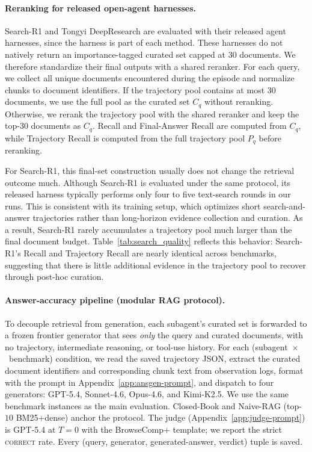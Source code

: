 \documentclass{article}
\begin{document}
\paragraph{Reranking for released open-agent harnesses.}
Search-R1 and Tongyi DeepResearch are evaluated with their released agent harnesses, since the harness is part of each method. These harnesses do not natively return an importance-tagged curated set capped at $30$ documents. We therefore standardize their final outputs with a shared reranker. For each query, we collect all unique documents encountered during the episode and normalize chunks to document identifiers. If the trajectory pool contains at most $30$ documents, we use the full pool as the curated set $C_q$ without reranking. Otherwise, we rerank the trajectory pool with the shared reranker and keep the top-$30$ documents as $C_q$. Recall and Final-Answer Recall are computed from $C_q$, while Trajectory Recall is computed from the full trajectory pool $P_q$ before reranking.

For Search-R1, this final-set construction usually does not change the
retrieval outcome much. Although Search-R1 is evaluated under the same protocol,
its released harness typically performs only four to five text-search rounds in
our runs. This is consistent with its training setup, which optimizes short
search-and-answer trajectories rather than long-horizon evidence collection and
curation. As a result, Search-R1 rarely accumulates a trajectory pool much
larger than the final document budget. Table~\ref{tab:search_quality} reflects
this behavior: Search-R1's Recall and Trajectory Recall are nearly identical
across benchmarks, suggesting that there is little additional evidence in the
trajectory pool to recover through post-hoc curation.

\paragraph{Answer-accuracy pipeline (modular RAG protocol).} To
decouple retrieval from generation, each subagent's curated set is
forwarded to a frozen frontier generator that sees \emph{only} the
query and curated documents, with no trajectory, intermediate
reasoning, or tool-use history. For each
(subagent~$\times$~benchmark) condition, we read the saved trajectory
JSON, extract the curated document identifiers and corresponding chunk
text from observation logs, format with the prompt in
Appendix~\ref{app:ansgen-prompt}, and dispatch to four generators:
GPT-5.4, Sonnet-4.6, Opus-4.6, and Kimi-K2.5. We use the same
benchmark instances as the main evaluation. Closed-Book and
Naive-RAG (top-$10$ BM25$+$dense) anchor the protocol. The judge
(Appendix~\ref{app:judge-prompt}) is GPT-5.4 at $T{=}0$ with the
BrowseComp+ template; we report the strict \textsc{correct} rate.
Every (query, generator, generated-answer, verdict) tuple is saved.
\end{document}
